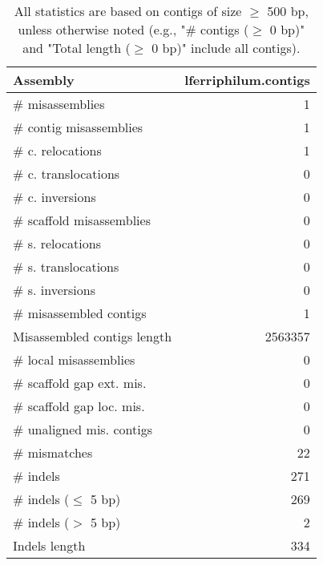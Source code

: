 \documentclass[12pt,a4paper]{article}
\begin{document}
\begin{table}[ht]
\begin{center}
\caption{All statistics are based on contigs of size $\geq$ 500 bp, unless otherwise noted (e.g., "\# contigs ($\geq$ 0 bp)" and "Total length ($\geq$ 0 bp)" include all contigs).}
\begin{tabular}{|l*{1}{|r}|}
\hline
Assembly & lferriphilum.contigs \\ \hline
\# misassemblies & 1 \\ \hline
\hspace{2mm}\# contig misassemblies & 1 \\ \hline
\hspace{5mm}\# c. relocations & 1 \\ \hline
\hspace{5mm}\# c. translocations & 0 \\ \hline
\hspace{5mm}\# c. inversions & 0 \\ \hline
\hspace{2mm}\# scaffold misassemblies & 0 \\ \hline
\hspace{5mm}\# s. relocations & 0 \\ \hline
\hspace{5mm}\# s. translocations & 0 \\ \hline
\hspace{5mm}\# s. inversions & 0 \\ \hline
\# misassembled contigs & 1 \\ \hline
Misassembled contigs length & 2563357 \\ \hline
\# local misassemblies & 0 \\ \hline
\# scaffold gap ext. mis. & 0 \\ \hline
\# scaffold gap loc. mis. & 0 \\ \hline
\# unaligned mis. contigs & 0 \\ \hline
\# mismatches & 22 \\ \hline
\# indels & 271 \\ \hline
\hspace{5mm}\# indels ($\leq$ 5 bp) & 269 \\ \hline
\hspace{5mm}\# indels ($>$ 5 bp) & 2 \\ \hline
Indels length & 334 \\ \hline
\end{tabular}
\end{center}
\end{table}
\end{document}
